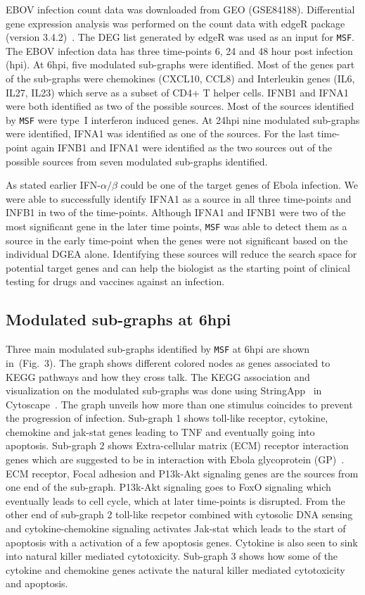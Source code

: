 \documentclass[twocolumn]{article}
\begin{document}
EBOV infection count data was downloaded from GEO (GSE84188). Differential gene expression analysis was performed on the count data with edgeR package (version 3.4.2)~\cite{edgeR}. The DEG list generated by edgeR was used as an input for \texttt{MSF}. The EBOV infection data has three time-points 6, 24  and 48 hour post infection (hpi). At 6hpi, five modulated sub-graphs were identified. Most of the genes part of the sub-graphs were chemokines (CXCL10, CCL8) and Interleukin genes (IL6, IL27, IL23) which serve as a subset of CD4+ T helper
cells. IFNB1 and IFNA1 were both identified as two of the possible sources. Most of the sources identified by \texttt{MSF} were type~I interferon induced genes. At 24hpi nine modulated sub-graphs were identified, IFNA1 was identified as one of the sources. For the last time-point again IFNB1 and IFNA1 were identified as the two sources out of the possible sources from seven modulated sub-graphs identified.

As stated earlier IFN-$\alpha / \beta$ could be one of the target
genes of Ebola infection. We were able to successfully identify IFNA1
as a source in all three time-points and INFB1 in two of the time-points. Although IFNA1 and IFNB1 were two of the most
significant gene in the later time points, \texttt{MSF} was able to detect them as
a source in the early time-point when the genes were not significant
based on the individual DGEA alone. Identifying these sources will reduce the search space for potential target genes and can help the biologist as the starting point of clinical testing for drugs and vaccines against an infection.

\subsection*{Modulated sub-graphs at 6hpi}

 Three main modulated sub-graphs identified by \texttt{MSF} at 6hpi are shown in~(Fig.~3). The graph shows different colored nodes as genes associated to KEGG pathways and how they cross talk. The KEGG association and visualization on the modulated sub-graphs was done using StringApp~\cite{StringApp} in Cytoscape~\cite{Cyto}. The graph unveils how more than one stimulus coincides to prevent the progression of infection. Sub-graph 1 shows toll-like receptor, cytokine, chemokine and jak-stat genes leading to TNF and eventually going into apoptosis. Sub-graph 2 shows Extra-cellular matrix (ECM) receptor interaction genes which are suggested to be in interaction with Ebola glycoprotein (GP)~\cite{Veljkovic}. ECM receptor, Focal adhesion and P13k-Akt signaling genes are the sources from one end of the sub-graph. P13k-Akt signaling goes to FoxO signaling which eventually leads to cell cycle, which at later time-points is disrupted. From the other end of sub-graph 2 toll-like recpetor combined with cytosolic DNA sensing and cytokine-chemokine signaling activates Jak-stat which leads to the start of apoptosis with a activation of a few apoptosis genes. Cytokine is also seen to sink into natural killer mediated cytotoxicity. Sub-graph 3 shows how some of the cytokine and chemokine genes activate the natural killer mediated cytotoxicity and apoptosis.
\end{document}
